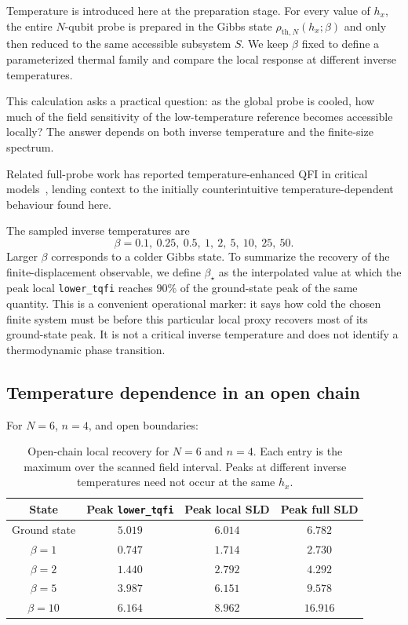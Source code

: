 Temperature is introduced here at the preparation stage. For every value of $h_x$, the entire $N$-qubit probe is prepared in the Gibbs state $\rho_{\mathrm{th},N}(h_x;\beta)$ and only then reduced to the same accessible subsystem $S$. We keep $\beta$ fixed to define a parameterized thermal family and compare the local response at different inverse temperatures.

This calculation asks a practical question: as the global probe is cooled, how much of the field sensitivity of the low-temperature reference becomes accessible locally? The answer depends on both inverse temperature and the finite-size spectrum.

Related full-probe work has reported temperature-enhanced QFI in critical models~\cite{osterma2024}, lending context to the initially counterintuitive temperature-dependent behaviour found here.

The sampled inverse temperatures are
\[
    \beta=0.1,\ 0.25,\ 0.5,\ 1,\ 2,\ 5,\ 10,\ 25,\ 50.
\]
Larger $\beta$ corresponds to a colder Gibbs state. To summarize the recovery of the finite-displacement observable, we define $\beta_\star$ as the interpolated value at which the peak local \texttt{lower\_tqfi} reaches $90\%$ of the ground-state peak of the same quantity. This is a convenient operational marker: it says how cold the chosen finite system must be before this particular local proxy recovers most of its ground-state peak. It is not a critical inverse temperature and does not identify a thermodynamic phase transition.

\subsection{Temperature dependence in an open chain}

For $N=6$, $n=4$, and open boundaries:
\begin{table}[htbp]
    \centering
    \caption{Open-chain local recovery for $N=6$ and $n=4$. Each entry is the maximum over the scanned field interval. Peaks at different inverse temperatures need not occur at the same $h_x$.}
    \label{tab:project7_open_recovery}
    \begin{tabular}{c c c c}
        \toprule
        State        & Peak \texttt{lower\_tqfi} & Peak local SLD & Peak full SLD \\
        \midrule
        Ground state & $5.019$                   & $6.014$        & $6.782$       \\
        $\beta=1$    & $0.747$                   & $1.714$        & $2.730$       \\
        $\beta=2$    & $1.440$                   & $2.792$        & $4.292$       \\
        $\beta=5$    & $3.987$                   & $6.151$        & $9.578$       \\
        $\beta=10$   & $6.164$                   & $8.962$        & $16.916$      \\
        \bottomrule
    \end{tabular}
\end{table}


